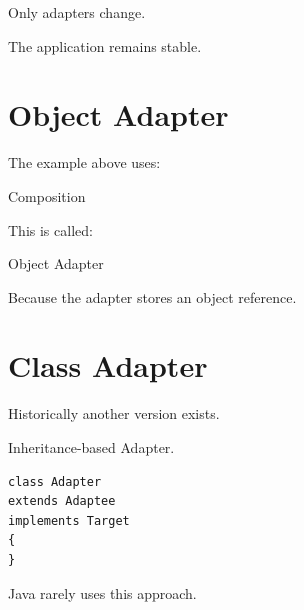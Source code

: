 \documentclass[11pt,a4paper]{book}
\begin{document}
Only adapters change.


The application remains stable.


\section{Object Adapter}

The example above uses:


Composition


This is called:


Object Adapter


Because the adapter stores
an object reference.


\section{Class Adapter}

Historically another version
exists.


Inheritance-based Adapter.


\begin{verbatim}
class Adapter
extends Adaptee
implements Target
{
}
\end{verbatim}


Java rarely uses this approach.

\end{document}
